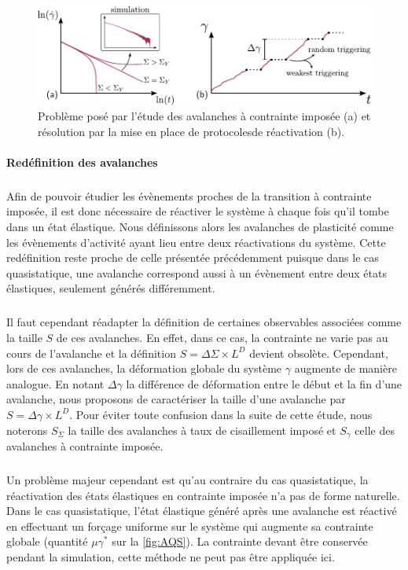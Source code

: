 \begin{figure}[h]
	\centering
	\includegraphics[width=\textwidth]{Chapitre4/Figures/Avalanches/PbContrainte.pdf}
	\caption{Problème posé par l'étude des avalanches à contrainte imposée (a) et résolution par la mise en place de protocolesde réactivation (b).}
	\label{fig:PbContrainte}
\end{figure}

\paragraph{Redéfinition des avalanches}

\subparagraph{}Afin de pouvoir étudier les évènements proches de la transition à contrainte imposée, il est donc nécessaire de réactiver le système à chaque fois qu'il tombe dans un état élastique. Nous définissons alors les avalanches de plasticité comme les évènements d'activité ayant lieu entre deux réactivations du système. Cette redéfinition reste proche de celle présentée précédemment puisque dans le cas quasistatique, une avalanche correspond aussi à un évènement entre deux états élastiques, seulement générés différemment.

\subparagraph{}Il faut cependant réadapter la définition de certaines observables associées comme la taille $S$ de ces avalanches. En effet, dans ce cas, la contrainte ne varie pas au cours de l'avalanche et la définition $S=\Delta\Sigma \times L^D$ devient obsolète. Cependant, lors de ces avalanches, la déformation globale du système $\gamma$ augmente de manière analogue. En notant $\Delta\gamma$ la différence de déformation entre le début et la fin d'une avalanche, nous proposons de caractériser la taille d'une avalanche par $S=\Delta\gamma \times L^D$. Pour éviter toute confusion dans la suite de cette étude, nous noterons $S_\Sigma$ la taille des avalanches à taux de cisaillement imposé et $S_\gamma$ celle des avalanches à contrainte imposée.

\subparagraph{}Un problème majeur cependant est qu'au contraire du cas quasistatique, la réactivation des états élastiques en contrainte imposée n'a pas de forme naturelle. Dans le cas quasistatique, l'état élastique généré après une avalanche est réactivé en effectuant un forçage uniforme sur le système qui augmente sa contrainte globale (quantité $\mu\gamma^*$ sur la \autoref{fig:AQS}). La contrainte devant être conservée pendant la simulation, cette méthode ne peut pas être appliquée ici.

